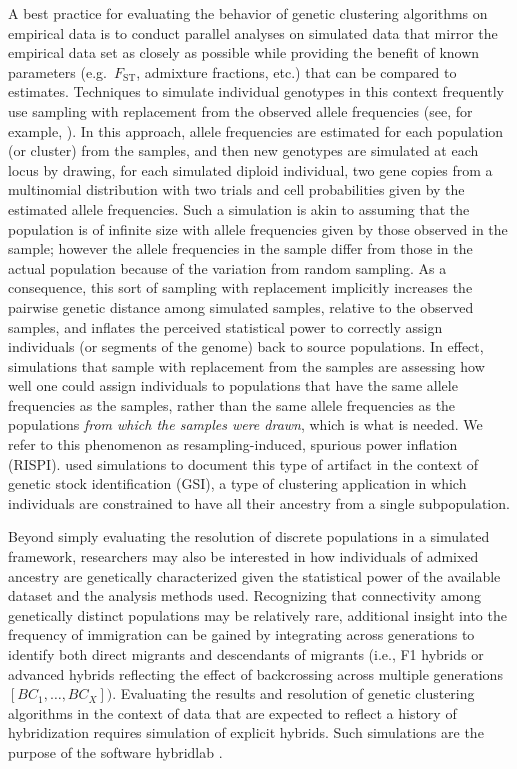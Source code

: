 A best practice for evaluating the behavior of genetic clustering algorithms on empirical data is to conduct
parallel analyses on simulated data that mirror the empirical data set
as closely as possible \citep{vaha2006efficiency,anderson2008improved,latch2011fine} while providing
the benefit of known parameters (e.g.~$F_\mathrm{ST}$, admixture fractions, etc.) that can
be compared to estimates.
Techniques to simulate individual genotypes in this context frequently use sampling with replacement from the
observed allele frequencies (see, for example, \citealt{nielsen2006hybridlab,kinziger2008hybridization}). In this
approach, allele frequencies are estimated for each population (or cluster) from the samples, and then new
genotypes are simulated at each locus by drawing, for each simulated diploid individual, two gene copies from a 
multinomial distribution with two trials
and cell probabilities given by the estimated allele frequencies.  Such a simulation is akin to assuming that the
population is of infinite size with allele frequencies given by those observed in the sample; however the allele
frequencies in the sample differ from those in the actual population because of the variation from random sampling.
As a consequence, this sort of sampling with replacement implicitly increases the pairwise genetic distance among simulated samples, relative to the observed
samples, and
inflates the perceived statistical power to correctly assign individuals (or segments of the genome) back to source 
populations.  In effect, simulations that sample with replacement from the samples are assessing how well one could 
assign individuals to populations
that have the same allele frequencies as the samples, rather than the same allele frequencies as the populations
{\em from which the samples were drawn}, which is what is needed.
We refer to this phenomenon as resampling-induced, spurious power inflation (RISPI).
\citet{anderson2008improved} used simulations to document this type of artifact in the context of
genetic stock identification (GSI), a type of clustering application in which individuals are constrained to have
all their ancestry from a single subpopulation.


Beyond simply evaluating the resolution of discrete populations in a simulated framework, researchers may also be
interested in how individuals of admixed ancestry are genetically characterized given the statistical power of the available dataset and the
analysis methods used.
Recognizing that connectivity among genetically distinct populations may be relatively rare, additional insight into the
frequency of immigration can be gained by integrating across generations to identify both direct migrants and descendants of migrants
 (i.e., F1 hybrids or advanced hybrids reflecting the effect of backcrossing across multiple generations $[BC_1, \ldots,
BC_X])$.
Evaluating the results and resolution of genetic clustering algorithms in the context of data that are
expected to reflect a history of hybridization requires simulation of
explicit hybrids.  Such simulations are the purpose of the software {\sc hybridlab} 
\citep{nielsen2006hybridlab}.


